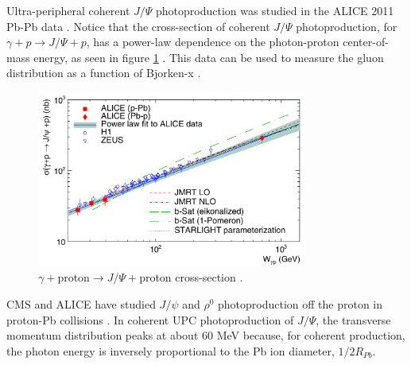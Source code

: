 Ultra-peripheral coherent $J/\Psi$ photoproduction was studied in the ALICE 2011 Pb-Pb data \cite{Abelev:2012ba}. Notice that the cross-section of coherent $J/\Psi$ photoproduction, for $\gamma+p\rightarrow J/\Psi+p$, has a power-law dependence on the photon-proton center-of-mass energy, as seen in figure \ref{fig:aliceData1} \cite{Klein:2017nqo}. This data can be used to measure the gluon distribution as a function of Bjorken-x \cite{pQCD2011.08}.

\begin{figure}[h!]
\begin{centering}
\includegraphics[width=3.5in]{Chapter2/importfigs/alice_jpsi_data.png}
\par\end{centering}
\caption{$\gamma +$proton$\rightarrow J/\Psi +$proton cross-section \cite{Klein:2017nqo}. \label{fig:aliceData1}}
\end{figure}

CMS and ALICE have studied $J/\psi$ and $\rho^0$ photoproduction off the proton in proton-Pb collisions \cite{TheALICE:2014dwa}. In coherent UPC photoproduction of $J/\Psi$, the transverse momentum distribution peaks at about 60 MeV because, for coherent production, the photon energy is inversely proportional to the Pb ion diameter, $1/2R_{Pb}$.

